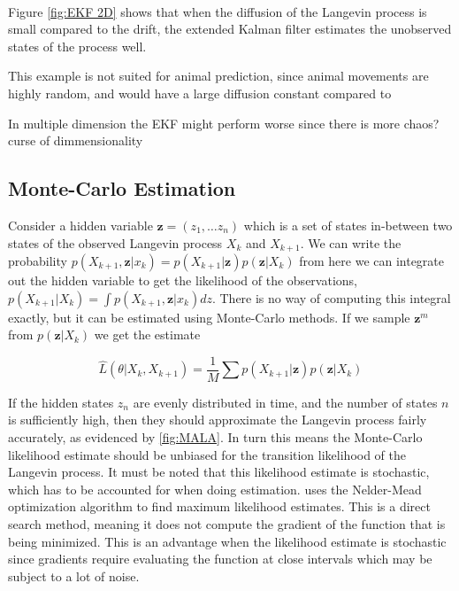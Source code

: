 \

Figure \ref{fig:EKF 2D} shows that when the diffusion of the Langevin process is small compared to the drift, the extended Kalman filter estimates the unobserved states of the process well. 




This example is not suited for animal prediction, since animal movements are highly random, and would have a large diffusion constant compared to 

In multiple dimension the EKF might perform worse since there is more chaos?
curse of dimmensionality







\subsection{Monte-Carlo Estimation}
Consider a hidden variable $\textbf{z} = (z_1, \dots z_n)$ which is a set of states in-between two states of the observed Langevin process $X_k$ and $X_{k+1}$. We can write the probability $p(X_{k+1}, \textbf{z} | x_k) = p(X_{k+1}|\textbf{z})p(\textbf{z}|X_k)$ from here we can integrate out the hidden variable to get the likelihood of the observations, $p(X_{k+1}|X_k) = \int p(X_{k+1}, \textbf{z} | x_k)dz$. There is no way of computing this integral exactly, but it can be estimated using Monte-Carlo methods. If we sample $\textbf{z}^m$ from $p(\textbf{z}|X_k)$ we get the estimate

$$
\hat{L}(\theta|X_k, X_{k+1}) = \frac{1}{M}\sum p(X_{k+1}|\textbf{z})p(\textbf{z}|X_k)
$$

If the hidden states $z_n$ are evenly distributed in time, and the number of states $n$ is sufficiently high, then they should approximate the Langevin process fairly accurately, as evidenced by \ref{fig:MALA}. In turn this means the Monte-Carlo likelihood estimate should be unbiased for the transition likelihood of the Langevin process. It must be noted that this likelihood estimate is stochastic, which has to be accounted for when doing estimation. \parencite{durham_numerical_2002} uses the Nelder-Mead optimization algorithm to find maximum likelihood estimates. This is a direct search method, meaning it does not compute the gradient of the function that is being minimized. This is an advantage when the likelihood estimate is stochastic since gradients require evaluating the function at close intervals which may be subject to a lot of noise. 

